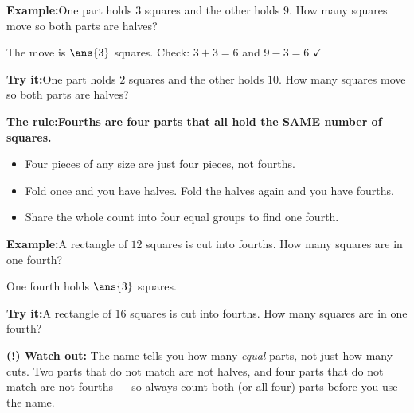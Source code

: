 \documentclass[12pt]{article}
\begin{document}
\begin{examplebox}
\textbf{Example:}\quad One part holds $3$ squares and the other holds $9$. How
many squares move so both parts are halves?



The move is $\ans{3}$ squares. Check: $3 + 3 = 6$ and $9 - 3 = 6$ $\checkmark$
\end{examplebox}

\begin{tryitbox}
\textbf{Try it:}\quad One part holds $2$ squares and the other holds $10$. How
many squares move so both parts are halves?

\end{tryitbox}


\begin{formulabox}
\textbf{The rule:}\quad \textbf{Fourths are four parts that all hold the SAME
number of squares.}
\begin{itemize}[leftmargin=0.8cm, itemsep=1pt, topsep=2pt]
  \item Four pieces of any size are just four pieces, not fourths.
  \item Fold once and you have halves. Fold the halves again and you have fourths.
  \item Share the whole count into four equal groups to find one fourth.
\end{itemize}
\end{formulabox}

\begin{examplebox}
\textbf{Example:}\quad A rectangle of $12$ squares is cut into fourths. How many
squares are in one fourth?



One fourth holds $\ans{3}$ squares.
\end{examplebox}

\begin{tryitbox}
\textbf{Try it:}\quad A rectangle of $16$ squares is cut into fourths. How many
squares are in one fourth?

\end{tryitbox}

\begin{watchoutbox}
\textbf{(!) Watch out:} The name tells you how many \emph{equal} parts, not just
how many cuts. Two parts that do not match are not halves, and four parts that
do not match are not fourths --- so always count both (or all four) parts before
you use the name.
\end{watchoutbox}
\end{document}
